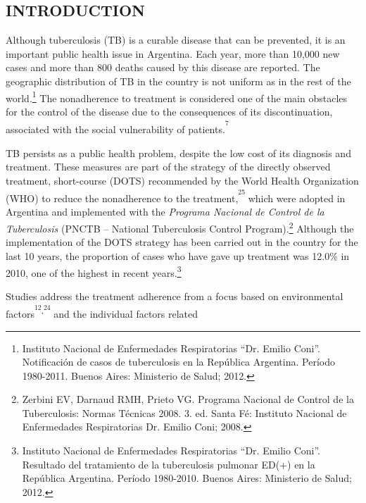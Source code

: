 \begin{multicols}{2}
\section*{INTRODUCTION}
\par{}Although tuberculosis (\allowbreak{}TB)\allowbreak{} is a curable disease that can be prevented,\allowbreak{} it is an important public health issue in Argentina.\allowbreak{} Each year,\allowbreak{} more than 10,\allowbreak{}000 new cases and more than 800 deaths caused by this disease are reported.\allowbreak{} The geographic distribution of TB in the country is not uniform as in the rest of the world.\allowbreak{}\protect\footnote{ Instituto Nacional de Enfermedades Respiratorias “Dr.\allowbreak{} Emilio Coni”.\allowbreak{} Notificación de casos de tuberculosis en la República Argentina.\allowbreak{} Período 1980-\allowbreak{}2011.\allowbreak{} Buenos Aires:\allowbreak{} Ministerio de Salud; 2012.\allowbreak{}} The nonadherence to treatment is considered one of the main obstacles for the control of the disease due to the consequences of its discontinuation,\allowbreak{} associated with the social vulnerability of patients.\allowbreak{}\textsuperscript{\textsuperscript{7}}\par{}TB persists as a public health problem,\allowbreak{} despite the low cost of its diagnosis and treatment.\allowbreak{} These measures are part of the strategy of the directly observed treatment,\allowbreak{} short-\allowbreak{}course (\allowbreak{}DOTS)\allowbreak{} recommended by the World Health Organization (\allowbreak{}WHO)\allowbreak{} to reduce the nonadherence to the treatment,\allowbreak{}\textsuperscript{\textsuperscript{25}} which were adopted in Argentina and implemented with the \textit{Programa Nacion}\textit{al de Control de la }\textit{Tuberculosis} (\allowbreak{}PNCTB – National Tuberculosis Control Program)\allowbreak{}.\allowbreak{}\protect\footnote{ Zerbini EV,\allowbreak{} Darnaud RMH,\allowbreak{} Prieto VG.\allowbreak{} Programa Nacional de Control de la Tuberculosis:\allowbreak{} Normas Técnicas 2008.\allowbreak{} 3.\allowbreak{} ed.\allowbreak{} Santa Fé:\allowbreak{} Instituto Nacional de Enfermedades Respiratorias Dr.\allowbreak{} Emilio Coni; 2008.\allowbreak{}} Although the implementation of the DOTS strategy has been carried out in the country for the last 10 years,\allowbreak{} the proportion of cases who have gave up treatment was 12.\allowbreak{}0\%\allowbreak{\allowbreak{}\allowbreak{}}\allowbreak{} in 2010,\allowbreak{} one of the highest in recent years.\allowbreak{}\protect\footnote{ Instituto Nacional de Enfermedades Respiratorias “Dr.\allowbreak{} Emilio Coni”.\allowbreak{} Resultado del tratamiento de la tuberculosis pulmonar ED(\allowbreak{}+\allowbreak{})\allowbreak{} en la República Argentina.\allowbreak{} Período 1980-\allowbreak{}2010.\allowbreak{} Buenos Aires:\allowbreak{} Ministerio de Salud; 2012.\allowbreak{}}\par{}Studies address the treatment adherence from a focus based on environmental factors\textsuperscript{\textsuperscript{12}}\textsuperscript{,\allowbreak{}}\textsuperscript{\textsuperscript{24}} and the individual factors related 
\end{multicols}
